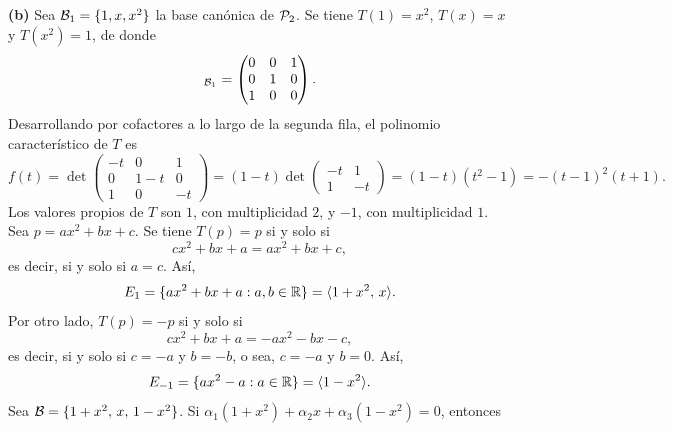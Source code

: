 \documentclass[12pt,a4paper]{article}
\begin{document}
\begin{solucion}
        \textbf{(b)} Sea $\mathcal{B}_{1}=\{1,x,x^{2}\}$ la base canónica de $\mathcal{P}_{2}$. Se tiene $T(1)=x^{2}$, $T(x)=x$ y $T(x^{2})=1$, de donde
        \begin{equation*}
            [T]_{\BB_{1}}=
            \begin{pmatrix}
                0 & 0 & 1\\
                0 & 1 & 0\\
                1 & 0 & 0
            \end{pmatrix}.
        \end{equation*}
        Desarrollando por cofactores a lo largo de la segunda fila, el polinomio característico de $T$ es
        \begin{equation*}
            f(t)=
            \det\begin{pmatrix}
                -t & 0 & 1\\
                0 & 1-t & 0\\
                1 & 0 & -t
            \end{pmatrix}
            =(1-t)
            \det\begin{pmatrix}
                -t & 1\\
                1 & -t
            \end{pmatrix}
            =(1-t)(t^{2}-1)=-(t-1)^{2}(t+1).
        \end{equation*}
        Los valores propios de $T$ son $1$, con multiplicidad $2$, y $-1$, con multiplicidad $1$. Sea $p=ax^{2}+bx+c$. Se tiene $T(p)=p$ si y solo si
        \begin{equation*}
            cx^{2}+bx+a=ax^{2}+bx+c,
        \end{equation*}
        es decir, si y solo si $a=c$. Así,
        \begin{equation*}
            E_{1}=\{ax^{2}+bx+a:a,b\in\mathbb{R}\}=\langle 1+x^{2},\,x \rangle.
        \end{equation*}
        Por otro lado, $T(p)=-p$ si y solo si
        \begin{equation*}
            cx^{2}+bx+a=-ax^{2}-bx-c,
        \end{equation*}
        es decir, si y solo si $c=-a$ y $b=-b$, o sea, $c=-a$ y $b=0$. Así,
        \begin{equation*}
            E_{-1}=\{ax^{2}-a:a\in\mathbb{R}\}=\langle 1-x^{2} \rangle.
        \end{equation*}
        Sea $\mathcal{B}=\{1+x^{2},\,x,\,1-x^{2}\}$. Si $\alpha_{1}(1+x^{2})+\alpha_{2}x+\alpha_{3}(1-x^{2})=0$, entonces
        \begin{equation*}

\end{equation*}
\end{solucion}
\end{document}
